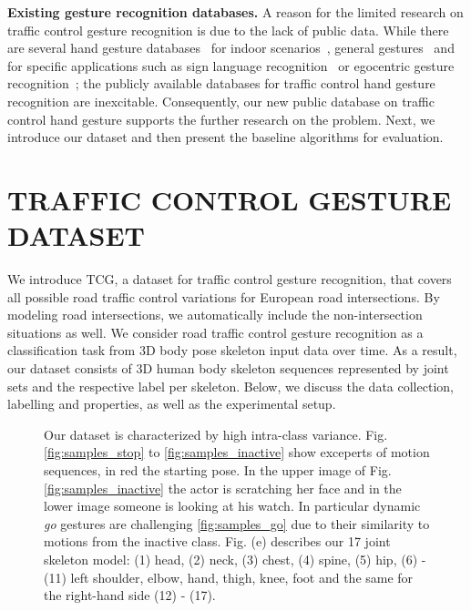 \documentclass[letterpaper, 10 pt, conference]{ieeeconf}
\begin{document}
\noindent \textbf{Existing gesture recognition databases.} A reason for the limited research on traffic control gesture recognition is due to the lack of public data. While there are several hand gesture databases~\cite{pisharady2013attention} for indoor scenarios~\cite{pisharady2015recent}, general gestures~\cite{escalera2013multi} and for specific applications such as sign language recognition~\cite{pugeault2011spelling} or egocentric gesture recognition~\cite{cao2017egocentric}; the publicly available databases for traffic control hand gesture recognition are inexcitable. Consequently, our new public database on traffic control hand gesture supports the further research on the problem. Next, we introduce our dataset and then present the baseline algorithms for evaluation. 

\section{TRAFFIC CONTROL GESTURE DATASET}

We introduce TCG, a dataset for traffic control gesture recognition, that covers all possible road traffic control variations for European road intersections. By modeling road intersections, we automatically include the non-intersection situations as well. We consider road traffic control gesture recognition as a classification task from 3D body pose skeleton input data over time. As a result, our dataset consists of 3D human body skeleton sequences represented by joint sets and the respective label per skeleton. Below, we discuss the data collection, labelling and properties, as well as the experimental setup.

\begin{figure}[t]
    \centering
    \caption{Our dataset is characterized by high intra-class variance. Fig. \ref{fig:samples_stop} to \ref{fig:samples_inactive} show exceperts of motion sequences, in red the starting pose. In the upper image of Fig. \ref{fig:samples_inactive} the actor is scratching her face and in the lower image someone is looking at his watch. In particular dynamic \emph{go} gestures are challenging \ref{fig:samples_go} due to their similarity to motions from the inactive class.  Fig. (e) describes our 17 joint skeleton model: (1) head, (2) neck, (3) chest, (4) spine, (5) hip, (6) - (11) left shoulder, elbow, hand, thigh, knee, foot and the same for the right-hand side (12) - (17).}
    \label{fig:dataset_samples}
\end{figure}
\end{document}
